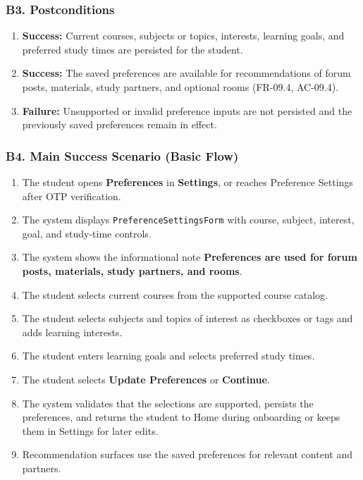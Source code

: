 \documentclass[12pt]{article}
\begin{document}
\hypertarget{sec:b3-postconditions}{}
\subsubsection*{B3. Postconditions}
\par\medskip

\begin{enumerate}
\item \textbf{Success:} Current courses, subjects or topics, interests, learning goals, and preferred study times are persisted for the student.
\item \textbf{Success:} The saved preferences are available for recommendations of forum posts, materials, study partners, and optional rooms (FR-09.4, AC-09.4).
\item \textbf{Failure:} Unsupported or invalid preference inputs are not persisted and the previously saved preferences remain in effect.
\end{enumerate}
\par\medskip

\hypertarget{sec:b4-main-success-scenario-basic-flow}{}
\subsubsection*{B4. Main Success Scenario (Basic Flow)}
\par\medskip

\begin{enumerate}
\item The student opens \textbf{Preferences} in \textbf{Settings}, or reaches Preference Settings after OTP verification.
\item The system displays \texttt{PreferenceSettingsForm} with course, subject, interest, goal, and study-time controls.
\item The system shows the informational note \textbf{Preferences are used for forum posts, materials, study partners, and rooms}.
\item The student selects current courses from the supported course catalog.
\item The student selects subjects and topics of interest as checkboxes or tags and adds learning interests.
\item The student enters learning goals and selects preferred study times.
\item The student selects \textbf{Update Preferences} or \textbf{Continue}.
\item The system validates that the selections are supported, persists the preferences, and returns the student to Home during onboarding or keeps them in Settings for later edits.
\item Recommendation surfaces use the saved preferences for relevant content and partners.
\end{enumerate}
\par\medskip
\end{document}
